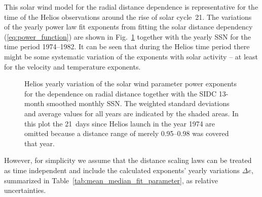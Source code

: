 \documentclass[]{aa}
\begin{document}
	This solar wind model for the radial distance dependence is representative for the time of the Helios observations around the rise of solar cycle~21. The variations of the yearly power law fit exponents from fitting the solar distance dependency (\ref{eq:power_function}) are shown in Fig.~\ref{fig:yearly_gradients_c} together with the yearly SSN for the time period \numrange{1974}{1982}. It can be seen that during the Helios time period there might be some systematic  variation of the exponents with solar activity -- at least for the velocity and temperature exponents.
	\begin{figure}
		\caption{Helios yearly variation of the solar wind parameter power exponents for the dependence on radial distance together with the SIDC 13-month smoothed monthly SSN. The weighted standard deviations and average values for all years are indicated by the shaded areas. In this plot the 21~days since Helios launch in the year 1974 are omitted because a distance range of merely \SIrange{0.95}{0.98}{\au} was covered that year.}
		\label{fig:yearly_gradients_c}
	\end{figure}
	However, for simplicity we assume that the distance scaling laws can be treated as time independent and include the calculated exponents’ yearly variations $\Delta e$, summarized in Table~\ref{tab:mean_median_fit_parameter}, as relative uncertainties.
\end{document}

